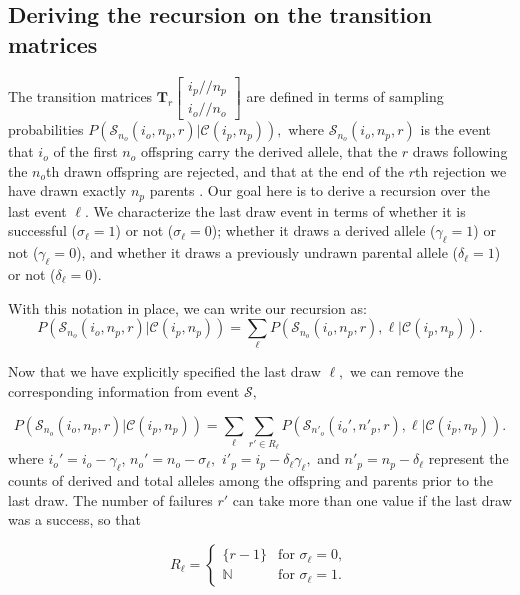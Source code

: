 \documentclass[review,nonatbib]{elsarticle}
\newcommand{\dslash}{/\!\!/}
\newcommand{\Coalc}[4]{\begin{bmatrix}#1\dslash #2 \\ #3\dslash #4 \end{bmatrix}}
\newcommand{\CC}{\mathcal{C}}
\newcommand{\ms}{\mathcal{S}}
\begin{document}
\subsection{Deriving the recursion on the transition matrices}
\label{subsec_apx_tpm_deriv}

The transition matrices $\mathbf{T}_{r}\Coalc{i_p}{n_p}{i_o}{n_o}$ are defined in terms of sampling
probabilities $P(\ms_{n_o}(i_o, n_p, r) | \CC{(i_p,n_p)} ),$ where $\ms_{n_o}(i_o,n_p, r)$ is the
event that $i_o$ of the first $n_o$ offspring carry the derived allele, that the $r$
draws following the $n_o$th drawn offspring are rejected, and that at the end of the $r$th
rejection we have drawn exactly $n_p$ parents . Our goal here is to derive a recursion
over the last event $\ell$. We characterize the last draw event in terms of whether it is
successful ($\sigma_\ell=1$) or not ($\sigma_\ell=0$); whether it draws a derived allele
($\gamma_\ell=1$) or not ($\gamma_\ell=0$), and whether it draws a previously undrawn parental
allele ($\delta_\ell=1$) or not ($\delta_\ell=0$).

With this notation in place, we can write our recursion as: 
 \begin{equation}
  P( \ms_{n_o}(i_o, n_p, r) | \CC{(i_p,n_p)} ) = \sum_\ell P( \ms_{n_o}(i_o, n_p, r),\ell | \CC(i_p,n_p) ) . 
 \end{equation}

Now that we have explicitly specified the last draw $\ell,$ we can remove the corresponding
information from event $\ms,$ 

\begin{equation}
  P(\ms_{n_o}(i_o, n_p, r) | \CC{(i_p,n_p)} ) = \sum_\ell \sum_{r' \in R_\ell} P(\ms_{n'_o}(i_o',
  n'_p, r),\ell | \CC{(i_p,n_p)} ) . 
\end{equation}
where $i_o' = i_o-\gamma_\ell$,  $n_o' = n_o-\sigma_\ell,$ $i'_p= i_p - \delta_\ell \gamma_\ell,$  and $n'_p  = n_p - \delta_\ell$ represent the 
counts of derived and total alleles among the offspring and parents prior to the last draw. 
 The number of failures $r'$ can take more than one value if the last draw was a success,
so that 

\begin{equation}
  R_\ell = \begin{cases} 
    \{r-1\}    & \text{for } \sigma_\ell = 0, \\
    \mathbb{N} & \text{for } \sigma_\ell = 1.
  \end{cases}
\end{equation} 
\end{document}
